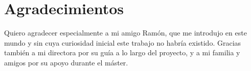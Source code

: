 %
\section*{Agradecimientos}
\label{sec::agradecimientos}


Quiero agradecer especialmente a mi amigo Ramón, que me introdujo en este mundo y sin cuya
curiosidad inicial este trabajo no habría existido. Gracias también a mi directora por su
guía a lo largo del proyecto, y a mi familia y amigos por su apoyo durante el máster.






